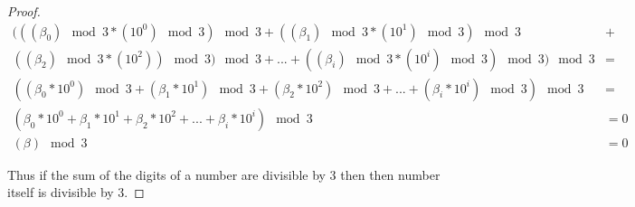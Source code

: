 \documentclass[12pt, fullpage]{article}
\begin{document}
\begin{proof}
\begin{align*}
( ((\beta_0)\mod 3*(10^0)\mod3) \mod 3 + ((\beta_1)\mod 3 * (10^1)\mod 3) \mod 3 & +\\((\beta_2)\mod 3 * (10^2))\mod 3) \mod 3 + ... + ((\beta_i)\mod 3 * (10^i)\mod 3) \mod 3 )\mod 3 &= \\
( (\beta_0*10^0) \mod 3 + (\beta_1 * 10^1) \mod 3 + (\beta_2 * 10^2) \mod 3 + ... + (\beta_i * 10^i) \mod 3 )\mod 3 &=\\
( \beta_0*10^0 + \beta_1 * 10^1 + \beta_2 * 10^2 + ... + \beta_i * 10^i ) \mod 3 &= 0\\
( \beta) \mod 3 &= 0
\end{align*}

Thus if the sum of the digits of a number are divisible by 3 then then number itself is divisible by 3.

\end{proof}
\end{document}
